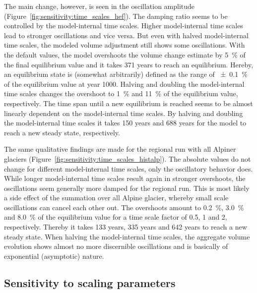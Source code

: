       The main change, however, is seen in the oscillation amplitude (Figure~\ref{fig:sensitivity:time_scales_hef}). The damping ratio seems to be controlled by the model-internal time scales. Higher model-internal time scales lead to stronger oscillations and vice versa. But even with halved model-internal time scales, the modeled volume adjustment still shows some oscillations. With the default values, the \vas{} model overshoots the volume change estimate by \SI{5}{\percent} of the final equilibrium value and it takes 371 years to reach an equilibrium. Hereby, an equilibrium state is (somewhat arbitrarily) defined as the range of \SI{\pm0.1}{\percent} of the equilibrium value at year 1000. Halving and doubling the model-internal time scales changes the overshoot to \SI{1}{\percent} and \SI{11}{\percent} of the equilibrium value, respectively. The time span until a new equilibrium is reached seems to be almost linearly dependent on the model-internal time scales. By halving and doubling the model-internal time scales it takes 150 years and 688 years for the model to reach a new steady state, respectively.

      The same qualitative findings are made for the regional run with all Alpiner glaciers (Figure~\ref{fig:sensitivity:time_scales_histalp}). The absolute values do not change for different model-internal time scales, only the oscillatory behavior does. While longer model-internal time scales result again in stronger overshoots, the oscillations seem generally more damped for the regional run. This is most likely a side effect of the summation over all Alpine glacier, whereby small scale oscillations can cancel each other out. The overshoots amount to \SI{0.2}{\percent}, \SI{3.0}{\percent} and \SI{8.0}{\percent} of the equilibrium value for a time scale factor of 0.5, 1 and 2, respectively. Thereby it takes 133 years, 335 years and 642 years to reach a new steady state. When halving the model-internal time scales, the aggregate volume evolution shows almost no more discernible oscillations and is basically of exponential (asymptotic) nature.


    \subsection{Sensitivity to scaling parameters} %
    \label{sec:sensitivity_to_scaling_parameters_results}

